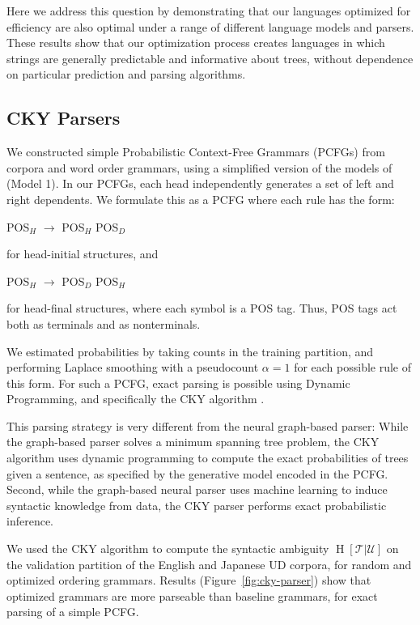 \documentclass[10pt,twoside,lineno]{article}
\newcommand{\utterance}{\mathcal{U}}
\newcommand{\tree}{\mathcal{T}}
\begin{document}
Here we address this question by demonstrating that our languages optimized for efficiency are also optimal under a range of different language models and parsers. These results show that our optimization process creates languages in which strings are generally predictable and informative about trees, without dependence on particular prediction and parsing algorithms.


\subsection{CKY Parsers}


We constructed simple Probabilistic Context-Free Grammars (PCFGs) from corpora and word order grammars, using a simplified version of the models of \cite{collins2003head} (Model 1).
In our PCFGs, each head independently generates a set of left and right dependents.
We formulate this as a PCFG where each rule has the form:
\begin{center}
	POS$_H$ $\rightarrow$ POS$_H$ POS$_D$
\end{center}
for head-initial structures, and
\begin{center}
	POS$_H$ $\rightarrow$ POS$_D$ POS$_H$
\end{center}
for head-final structures, where each symbol is a POS tag.
Thus, POS tags act both as terminals and as nonterminals.

We estimated probabilities by taking counts in the training partition, and performing Laplace smoothing with a pseudocount $\alpha=1$ for each possible rule of this form.
For such a PCFG, exact parsing is possible using Dynamic Programming, and specifically the CKY algorithm \cite{kasami1966efficient}.

This parsing strategy is very different from the neural graph-based parser:
While the graph-based parser solves a minimum spanning tree problem, the CKY algorithm uses dynamic programming to compute the exact probabilities of trees given a sentence, as specified by the generative model encoded in the PCFG.
Second, while the graph-based neural parser uses machine learning to induce syntactic knowledge from data, the CKY parser performs exact probabilistic inference.

We used the CKY algorithm to compute the syntactic ambiguity $\operatorname{H}[\tree|\utterance]$ on the validation partition of the English and Japanese UD corpora, for random and optimized ordering grammars.
Results (Figure~\ref{fig:cky-parser}) show that optimized grammars are more parseable than baseline grammars, for exact parsing of a simple PCFG.
\end{document}
